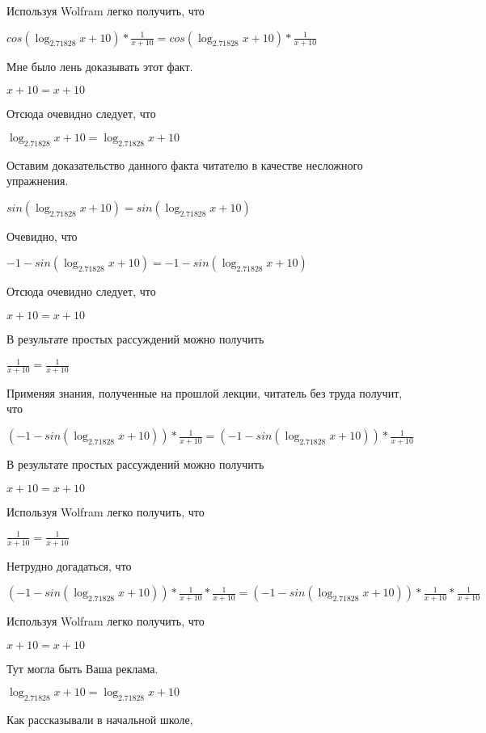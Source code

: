 \documentclass[12pt,a4paper,fleqn]{article}
\theoremstyle{definition}
\begin{document}
Используя Wolfram легко получить, что 

$cos(\log_{ 2.71828 }{ x  +  10 }) * \frac{ 1 }{ x  +  10 }
 = cos(\log_{ 2.71828 }{ x  +  10 }) * \frac{ 1 }{ x  +  10 }
$

Мне было лень доказывать этот факт.

$ x  +  10  =  x  +  10 $

Отсюда очевидно следует, что 

$\log_{ 2.71828 }{ x  +  10 } = \log_{ 2.71828 }{ x  +  10 }$

Оставим доказательство данного факта читателю в качестве несложного упражнения. 

$sin(\log_{ 2.71828 }{ x  +  10 }) = sin(\log_{ 2.71828 }{ x  +  10 })$

Очевидно, что 

$ -1  - sin(\log_{ 2.71828 }{ x  +  10 }) =  -1  - sin(\log_{ 2.71828 }{ x  +  10 })$

Отсюда очевидно следует, что 

$ x  +  10  =  x  +  10 $

В результате простых рассуждений можно получить 

$\frac{ 1 }{ x  +  10 }
 = \frac{ 1 }{ x  +  10 }
$

Применяя знания, полученные на прошлой лекции, читатель без труда получит, что 

$( -1  - sin(\log_{ 2.71828 }{ x  +  10 })) * \frac{ 1 }{ x  +  10 }
 = ( -1  - sin(\log_{ 2.71828 }{ x  +  10 })) * \frac{ 1 }{ x  +  10 }
$

В результате простых рассуждений можно получить 

$ x  +  10  =  x  +  10 $

Используя Wolfram легко получить, что 

$\frac{ 1 }{ x  +  10 }
 = \frac{ 1 }{ x  +  10 }
$

Нетрудно догадаться, что 

$( -1  - sin(\log_{ 2.71828 }{ x  +  10 })) * \frac{ 1 }{ x  +  10 }
 * \frac{ 1 }{ x  +  10 }
 = ( -1  - sin(\log_{ 2.71828 }{ x  +  10 })) * \frac{ 1 }{ x  +  10 }
 * \frac{ 1 }{ x  +  10 }
$

Используя Wolfram легко получить, что 

$ x  +  10  =  x  +  10 $

Тут могла быть Ваша реклама. 

$\log_{ 2.71828 }{ x  +  10 } = \log_{ 2.71828 }{ x  +  10 }$

Как рассказывали в начальной школе, 
\end{document}
